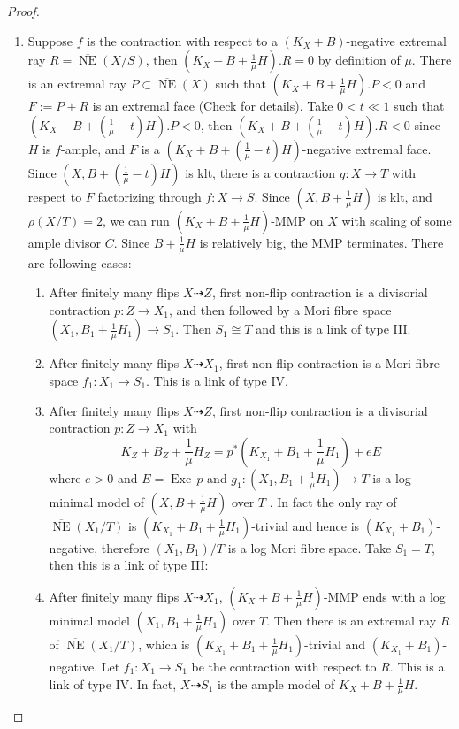 \documentclass{article}
\begin{document}
\begin{proof}
\begin{enumerate}[A]
  \item\label{a}  Suppose $ f $ is the contraction with respect to a $ (K_X+B) $-negative extremal ray $ R= \overline{\operatorname{ NE }}(X/S) $, then $ (K_X+B+\frac{1}{\mu}H).R=0 $ by definition of $ \mu $. There is an extremal ray $ P \subset \overline{\operatorname{ NE }}(X) $ such that $ (K_X+B+\frac{1}{\mu}H).P<0 $ and $ F:=P+R $ is an extremal face  (Check \cite[5.4.2]{cortiFactoringBirationalMaps} for details). Take  $ 0<t\ll 1 $ such that $ (K_X+B+(\frac{1}{\mu}-t)H).P<0 $, then $  (K_X+B+(\frac{1}{\mu}-t)H).R<0 $ since $H$ is $f$-ample, and $ F $ is a $  (K_X+B+(\frac{1}{\mu}-t)H) $-negative extremal face. Since $ (X,B+(\frac{1}{\mu}-t)H) $ is klt, there is  a contraction $ g:X\to T $ with respect  to $ F $ factorizing through $ f:X\to S $. Since  $ (X,B+\frac{1}{\mu}H) $ is klt, and $ \rho(X/T)=2 $,  we can  run $ (K_X+B+\frac{1}{\mu}H) $-MMP on $ X  $ with scaling of some ample divisor $C$.  Since $ B+\frac{1}{\mu}H $ is relatively big,  the MMP terminates. There are following cases: 
  \begin{enumerate}[1]
    \item\label{a1} 
After finitely many flips $ X\dashrightarrow Z $, first non-flip contraction is a divisorial contraction $ p:Z\to X_1 $, and then followed by a Mori fibre space $(X_{1},B_{1}+\frac{1}{\mu}H_{1} )\to S_{1}$. 
    Then  $S_{1} \cong T$ and this is a link of type III.     
   \item\label{a2}
      After finitely many flips $ X\dashrightarrow X_1 $, first non-flip contraction is a Mori fibre space $ f_1:X_1\to S_{1} $. This is a link of type IV.  
    \item \label{a3}
      After finitely many flips $ X\dashrightarrow Z $, first non-flip contraction is a divisorial contraction $ p:Z\to X_1$ with 
    \[ K_Z+B_Z+\frac{1}{\mu}H_Z=p^*(K_{X_1}+B_1+\frac{1}{\mu}H_1)+eE \]
    where $ e>0 $ and  $E=\operatorname{Exc}\,p$ and  $g_{1}: (X_1,B_1+\frac{1}{\mu}H_1) \to T$ is a log minimal model of $(X,B+\frac{1}{\mu}H)$ over $T$ . In fact the only ray of $ \overline{\operatorname{NE}}(X_1/T) $ is $ (K_{X_1}+B_1+\frac{1}{\mu}H_1) $-trivial and hence is $ (K_{X_1}+B_1) $-negative, therefore $ (X_1,B_1)/T $ is a log Mori fibre space. Take $ S_1=T $, then this is a link of type III:
  \item \label{a4}After finitely many flips $ X\dashrightarrow X_1 $, $(K_{X}+B+\frac{1}{\mu}H)$-MMP ends with a log minimal model $ (X_1,B_1+\frac{1}{\mu}H_1) $ over $T $. Then there is an extremal ray $R$ of $ \overline{\operatorname{NE}}(X_1/T) $, which is $ (K_{X_1}+B_1+\frac{1}{\mu}H_1) $-trivial and $ (K_{X_1}+B_1) $-negative. Let $ f_1:X_1\to S_1 $ be the contraction with respect to $R$. This is a link of type IV. In fact, $X \dashrightarrow  S_{1}$ is the ample model of $K_{X}+B+\frac{1}{\mu}H$.

\end{enumerate}
\end{enumerate}
\end{proof}
\end{document}
